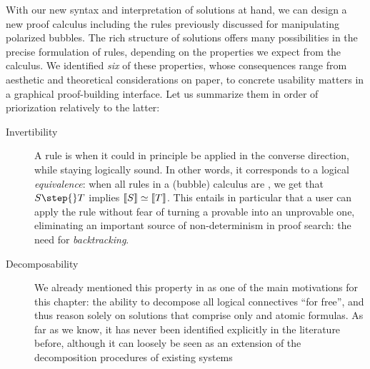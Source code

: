 With our new syntax and interpretation of solutions at hand, we can design a new
proof calculus including the rules previously discussed for manipulating
polarized bubbles. The rich structure of solutions offers many possibilities in
the precise formulation of rules, depending on the properties we expect from the
calculus. We identified \emph{six} of these properties, whose consequences range
from aesthetic and theoretical considerations on paper, to concrete usability
matters in a graphical proof-building interface. Let us summarize them in order
of priorization relatively to the latter:
\begin{description}
  \item[Invertibility]
    A rule is  when it could in principle be applied in the converse
    direction, while staying logically sound. In other words, it corresponds to
    a logical \emph{equivalence}: when all rules in a (bubble) calculus are
    , we get that $S \step{} T$ implies $\left\llbracket S \right\rrbracket \simeq
    \left\llbracket T \right\rrbracket$. This entails in particular that a user can apply the rule
    without fear of turning a provable  into an unprovable
    one, eliminating an important source of
    non-determinism in proof search: the need for
    \emph{backtracking}.
  \item[Decomposability]
    We already mentioned this property in  as one of the
    main motivations for this chapter: the ability to decompose all logical
    connectives ``for free'', and thus reason solely on solutions that comprise
    only  and atomic formulas. As far as we know, it has never been
    identified explicitly in the literature before, although it can loosely be
    seen as an extension of the decomposition procedures of existing  systems
\end{description}
